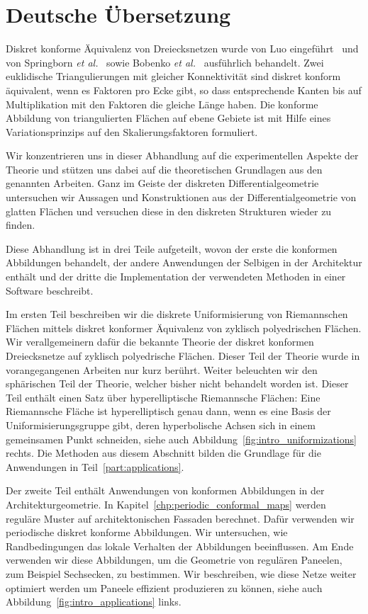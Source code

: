 \documentclass[Thesis.tex]{subfiles}
\begin{document}
\section*{Deutsche \"{U}bersetzung}
Diskret konforme \"{A}quivalenz von Dreiecksnetzen wurde von Luo eingef{\"u}hrt~\cite{Luo2004:Yamabe} und von Springborn {\it et al.}~\cite{Springborn2008} sowie Bobenko {\it et al.}~\cite{BPS2015:dconf} ausf{\"u}hrlich behandelt.
Zwei euklidische Triangulierungen mit gleicher Konnektivit\"{a}t sind diskret konform \"{a}quivalent, wenn es  Faktoren pro Ecke gibt, so dass entsprechende Kanten bis auf Multiplikation mit den Faktoren die gleiche L\"{a}nge haben.
Die konforme Abbildung von triangulierten Fl\"{a}chen auf ebene Gebiete ist mit Hilfe eines Variationsprinzips auf den Skalierungsfaktoren formuliert.

Wir konzentrieren uns in dieser Abhandlung auf die experimentellen Aspekte der Theorie und st\"{u}tzen uns dabei auf die theoretischen Grundlagen aus den genannten Arbeiten.
Ganz im Geiste der diskreten Differentialgeometrie untersuchen wir Aussagen und Konstruktionen aus der Differentialgeometrie von glatten Fl\"{a}chen und versuchen diese in den diskreten Strukturen wieder zu finden.

Diese Abhandlung ist in drei Teile aufgeteilt, wovon der erste die konformen Abbildungen behandelt, der andere Anwendungen der Selbigen in der Architektur enth\"{a}lt und der dritte die Implementation der verwendeten Methoden in einer Software beschreibt.

Im ersten Teil beschreiben wir die diskrete Uniformisierung von Riemannschen Fl\"{a}chen mittels diskret konformer \"{A}quivalenz von zyklisch polyedrischen Fl\"{a}chen.
Wir verallgemeinern daf\"{u}r die bekannte Theorie der diskret konformen Dreiecksnetze auf zyklisch polyedrische Fl\"{a}chen.
Dieser Teil der Theorie wurde in vorangegangenen Arbeiten nur kurz ber\"{u}hrt.
Weiter beleuchten wir den sph\"{a}rischen Teil der Theorie, welcher bisher nicht behandelt worden ist.
Dieser Teil enth\"{a}lt einen Satz \"{u}ber hyperelliptische Riemannsche Fl\"{a}chen: 
Eine Riemannsche Fl\"{a}che ist hyperelliptisch genau dann, wenn es eine Basis der Uniformisierungsgruppe gibt, deren hyperbolische Achsen sich in einem gemeinsamen Punkt schneiden, siehe auch Abbildung~\ref{fig:intro_uniformizations} rechts.
Die Methoden aus diesem Abschnitt bilden die Grundlage f\"{u}r die Anwendungen in Teil~\ref{part:applications}.

Der zweite Teil enth\"{a}lt Anwendungen von konformen Abbildungen in der Architekturgeometrie.
In Kapitel~\ref{chp:periodic_conformal_maps} werden regul\"{a}re Muster auf architektonischen Fassaden berechnet.
Daf\"{u}r verwenden wir periodische diskret konforme Abbildungen.
Wir untersuchen, wie Randbedingungen das lokale Verhalten der Abbildungen beeinflussen.
Am Ende verwenden wir diese Abbildungen, um die Geometrie von regul\"{a}ren Paneelen, zum Beispiel Sechsecken, zu bestimmen. 
Wir beschreiben, wie diese Netze weiter optimiert werden um Paneele effizient produzieren zu k\"{o}nnen, siehe auch Abbildung~\ref{fig:intro_applications} links.
\end{document}
